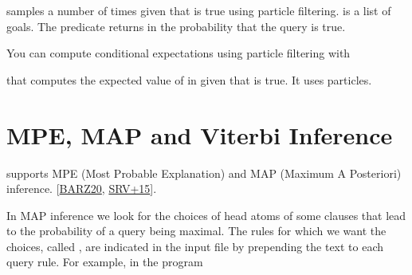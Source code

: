 \documentclass[letterpaper,10pt,english]{sphinxmanual}
\begin{document}
\sphinxAtStartPar
samples  a number of  times given that  is true using particle filtering.  is a list of goals.
The predicate returns in  the probability that the query is true.

\sphinxAtStartPar
You can compute conditional expectations using particle filtering with

\begin{sphinxVerbatim}[commandchars=\\\{\}]
  
\end{sphinxVerbatim}

\sphinxAtStartPar
that computes the expected value of  in  given that  is true.
It uses  particles.


\section{MPE, MAP and Viterbi Inference}
\label{\detokenize{index:mpe-map-and-viterbi-inference}}
\sphinxAtStartPar
{} supports MPE (Most Probable Explanation) and MAP (Maximum A Posteriori) inference. {[}\hyperlink{cite.index:id45}{BARZ20}, \hyperlink{cite.index:id44}{SRV+15}{]}.

\sphinxAtStartPar
In MAP inference we look for the choices of head atoms of some clauses that lead to the probability of a query being
maximal. The rules for which we want the choices, called , are indicated in the input file by prepending
the text  to each query rule. For example, in the program 
\end{document}
